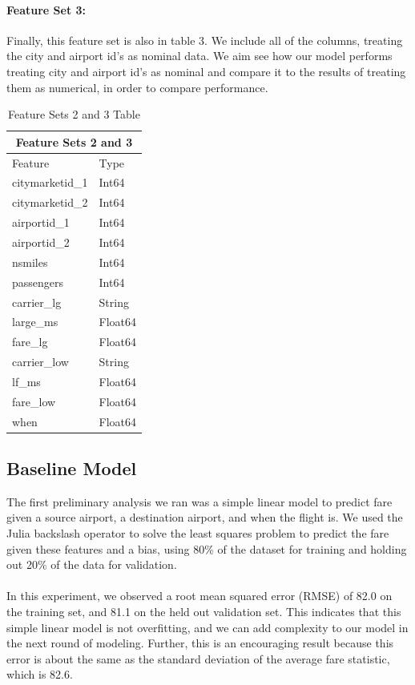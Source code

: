 \documentclass{article}
\begin{document}
\paragraph{Feature Set 3:} Finally, this feature set is also in table 3. We include all of the columns, treating the city and airport id's as nominal data. We aim see how our model performs treating city and airport id's as nominal and compare it to the results of treating them as numerical, in order to compare performance. 
\begin{table}[h!]
\centering
\begin{tabular}{ |p{3cm}||p{3cm}|  }
 \hline
 \multicolumn{2}{|c|}{Feature Sets 2 and 3} \\
 \hline Feature & Type\\
 \hline
 citymarketid\_1 & Int64\\
 citymarketid\_2 & Int64\\
airportid\_1 & Int64\\
airportid\_2 & Int64\\
nsmiles & Int64\\
passengers & Int64 \\
carrier\_lg & String\\
large\_ms & Float64 \\
fare\_lg & Float64\\
carrier\_low & String\\
lf\_ms & Float64\\
fare\_low & Float64\\
when & Float64\\
 \hline
\end{tabular}
\caption{Feature Sets 2 and 3 Table}
\label{table:1}
\end{table}
\subsection{Baseline Model}
The first preliminary analysis we ran was a simple linear model to predict fare given a source airport, a destination airport, and when the flight is. We used the Julia backslash operator to solve the least squares problem to predict the fare given these features and a bias, using 80\% of the dataset for training and holding out 20\% of the data for validation.\\\\
In this experiment, we observed a root mean squared error (RMSE) of 82.0 on the training set, and 81.1 on the held out validation set. This indicates that this simple linear model is not overfitting, and we can add complexity to our model in the next round of modeling. Further, this is an encouraging result because this error is about the same as the standard deviation of the average fare statistic, which is 82.6. 
\end{document}
